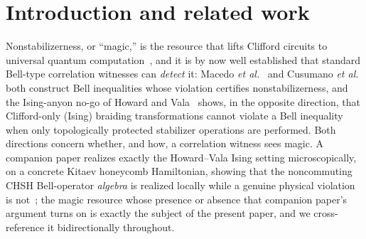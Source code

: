 \documentclass[aps,pra,twocolumn,superscriptaddress,longbibliography,floatfix,nofootinbib]{revtex4-2}
\begin{document}

\maketitle

\section{Introduction and related work}
\label{sec:intro}

Nonstabilizerness, or ``magic,'' is the resource that lifts Clifford
circuits to universal quantum computation~\cite{VeitchEtAl2014,%
HowardCampbell2017}, and it is by now well established that standard
Bell-type correlation witnesses can \emph{detect} it: Macedo \emph{et
al.}~\cite{Macedo2025} and Cusumano \emph{et
al.}~\cite{Cusumano2026} both construct Bell inequalities whose
violation certifies nonstabilizerness, and the Ising-anyon no-go of
Howard and Vala~\cite{HowardVala2012} shows, in the opposite direction,
that Clifford-only (Ising) braiding transformations cannot violate a
Bell inequality when only topologically protected stabilizer operations
are performed. Both directions concern whether, and how, a
correlation witness sees magic. A companion paper realizes exactly
the Howard--Vala Ising setting microscopically, on a concrete Kitaev
honeycomb Hamiltonian, showing that the noncommuting CHSH
Bell-operator \emph{algebra} is realized locally while a genuine
physical violation is not~\cite{Sayim2026witness}; the magic resource
whose presence or absence that companion paper's argument turns on is
exactly the subject of the present paper, and we cross-reference it
bidirectionally throughout.
\end{document}
